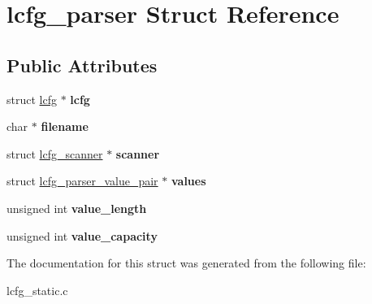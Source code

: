 \hypertarget{structlcfg__parser}{\section{lcfg\+\_\+parser Struct Reference}
\label{structlcfg__parser}
}
\subsection*{Public Attributes}
\begin{DoxyCompactItemize}
\item 
\hypertarget{structlcfg__parser_a4a9b24160b18516d283c913296e0b90d}{struct \hyperlink{structlcfg}{lcfg} $\ast$ {\bfseries lcfg}}\label{structlcfg__parser_a4a9b24160b18516d283c913296e0b90d}

\item 
\hypertarget{structlcfg__parser_a2667151d72fd3ca8b241676834b891ce}{char $\ast$ {\bfseries filename}}\label{structlcfg__parser_a2667151d72fd3ca8b241676834b891ce}

\item 
\hypertarget{structlcfg__parser_ae86982303a26985e6dae7275b4624661}{struct \hyperlink{structlcfg__scanner}{lcfg\+\_\+scanner} $\ast$ {\bfseries scanner}}\label{structlcfg__parser_ae86982303a26985e6dae7275b4624661}

\item 
\hypertarget{structlcfg__parser_a75354cd041b465f1c3fea34802de325d}{struct \hyperlink{structlcfg__parser__value__pair}{lcfg\+\_\+parser\+\_\+value\+\_\+pair} $\ast$ {\bfseries values}}\label{structlcfg__parser_a75354cd041b465f1c3fea34802de325d}

\item 
\hypertarget{structlcfg__parser_a32a233c04751695ed1e3103f7538a083}{unsigned int {\bfseries value\+\_\+length}}\label{structlcfg__parser_a32a233c04751695ed1e3103f7538a083}

\item 
\hypertarget{structlcfg__parser_a2a0d8e132480cdd173ffd2040302121f}{unsigned int {\bfseries value\+\_\+capacity}}\label{structlcfg__parser_a2a0d8e132480cdd173ffd2040302121f}

\end{DoxyCompactItemize}


The documentation for this struct was generated from the following file\+:\begin{DoxyCompactItemize}
\item 
lcfg\+\_\+static.\+c\end{DoxyCompactItemize}
